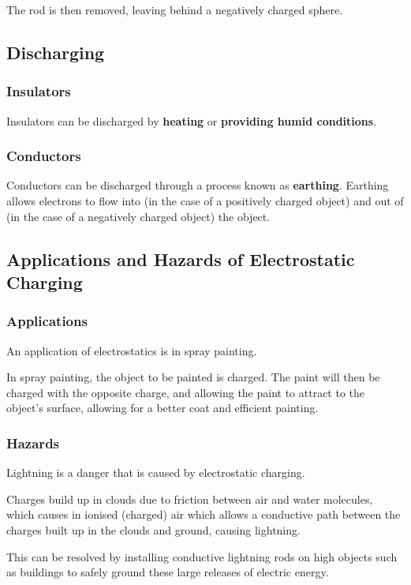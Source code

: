 \documentclass[../main.tex]{subfiles}
\begin{document}
		The rod is then removed, leaving behind a negatively charged sphere.
		\begin{center}
		\end{center}
		\subsection{Discharging}
		\subsubsection{Insulators}
		Insulators can be discharged by \textbf{heating} or \textbf{providing humid conditions}.
		
		\subsubsection{Conductors}
		Conductors can be discharged through a process known as \textbf{earthing}. Earthing allows electrons to flow into (in the case of a positively charged object) and out of (in the case of a negatively charged object) the object.
		\subsection{Applications and Hazards of Electrostatic Charging }
		\subsubsection{Applications}
		An application of electrostatics is in spray painting.
		
		In spray painting, the object to be painted is charged. The paint will then be charged with the opposite charge, and allowing the paint to attract to the object's surface, allowing for a better coat and efficient painting.
		
		\subsubsection{Hazards}
		Lightning is a danger that is caused by electrostatic charging.
		
		Charges build up in clouds due to friction between air and water molecules, which causes in ionised (charged) air which allows a conductive path between the charges built up in the clouds and ground, causing lightning.
		
		This can be resolved by installing conductive lightning rods on high objects such as buildings to safely ground these large releases of electric energy.
\end{document}

